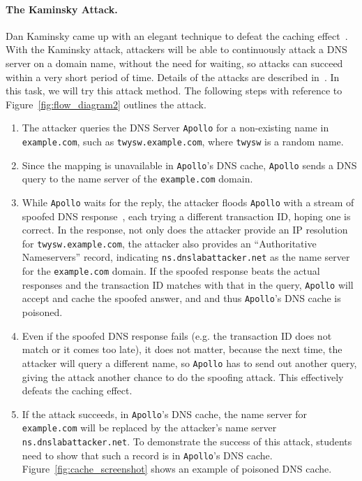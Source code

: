 \paragraph{The Kaminsky Attack.} 
Dan Kaminsky came up with an elegant technique to defeat the caching effect~\cite{Kaminsky}.
With the Kaminsky attack, attackers will be able to continuously attack
a DNS server on a domain name, without the need for waiting, so
attacks can succeed within a very short period of time.
Details of the attacks are described in~\cite{Kaminsky}. 
In this task, we will try this attack method. The following steps with reference to 
Figure~\ref{fig:flow_diagram2} outlines the attack. 

\begin{enumerate}
\item The attacker queries the DNS Server {\tt Apollo} for a non-existing name in 
{\tt example.com}, such as {\tt twysw.example.com},
where {\tt twysw} is a random name. 

\item Since the mapping is unavailable in {\tt Apollo}'s DNS cache, 
{\tt Apollo} sends a DNS query to the name server of
the {\tt example.com} domain.

\item While {\tt Apollo} waits for the reply, 
the attacker floods {\tt Apollo} with a stream of spoofed DNS response~\cite{bib6}, 
each trying a different transaction ID, hoping one is correct.
In the response, not only does the attacker provide an IP resolution
for {\tt twysw.example.com}, the attacker 
also provides an ``Authoritative Nameservers'' record, indicating 
{\tt ns.dnslabattacker.net} as the name server for the {\tt example.com} domain.
If the spoofed response beats the actual responses and
the transaction ID matches with that in the query, 
{\tt Apollo} will accept and cache the spoofed answer, and
and thus {\tt Apollo}'s DNS cache is poisoned.  

\item Even if the spoofed DNS response fails (e.g.
the transaction ID does not match or it comes too late),
it does not matter, because the next time, the attacker will query
a different name, so {\tt Apollo} has to send out another query, 
giving the attack another chance to do the spoofing attack. 
This effectively defeats the caching effect.


\item If the attack succeeds, in {\tt Apollo}'s DNS cache, the
name server for {\tt example.com} will be replaced by the attacker's
name server {\tt ns.dnslabattacker.net}.
To demonstrate the success of this attack, students need to show that such a record 
is in {\tt Apollo}'s DNS cache. Figure~\ref{fig:cache_screenshot} shows 
an example of poisoned DNS cache.

\end{enumerate}




